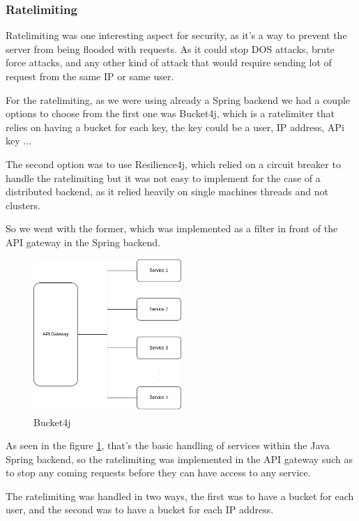 \subsubsection {Ratelimiting}

Ratelimiting was one interesting aspect for security, as it's a way to prevent the
server from being flooded with requests. As it could stop DOS attacks, brute force
attacks, and any other kind of attack that would require sending lot of request from 
the same IP or same user.

For the ratelimiting, as we were using already a Spring backend we had a couple options
to choose from the first one was Bucket4j, which is a ratelimiter that relies on having
a bucket for each key, the key could be a user, IP address, APi key ...

The second option was to use Resilience4j, which relied on a circuit breaker to
handle the ratelimiting but it was not easy to implement for the case of a distributed
backend, as it relied heavily on single machines threads and not clusters.

So we went with the former, which was implemented as a filter in front of the API gateway
in the Spring backend.

\begin{figure}[!htbp]
    \centering
    \includegraphics[width=0.5\textwidth]{images/ratelimiting.png} 
    \caption{\footnotesize{Bucket4j}}
    \label{fig:bucket4j}
\end{figure}


As seen in the figure \ref{fig:bucket4j}, that's the basic handling of services within the
Java Spring backend, so the ratelimiting was implemented in the API gateway such as to
stop any coming requests before they can have access to any service.

The ratelimiting was handled in two ways, the first was to have a bucket for each user,
and the second was to have a bucket for each IP address.

